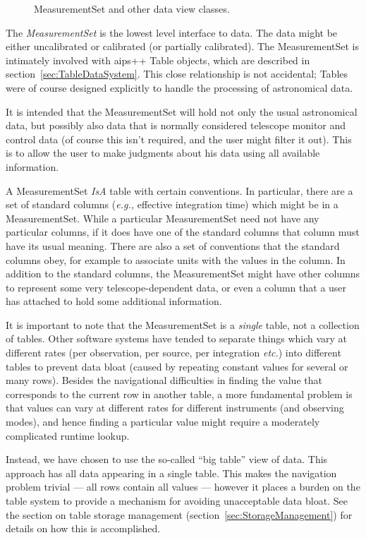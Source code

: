 \begin{figure}
\epsfverbosetrue
\epsfxsize=6.0in
\caption{MeasurementSet and other data view classes.}
\label{fig:ms}
\end{figure}

The {\em MeasurementSet} is the lowest level interface to data. The
data might be either uncalibrated or calibrated (or partially
calibrated). The MeasurementSet is intimately involved with {\sc
aips++} Table objects, which are described in
section~\ref{sec:TableDataSystem}. This close relationship is not
accidental; Tables were of course designed explicitly to handle the
processing of astronomical data.

It is intended that the MeasurementSet will hold not only the usual
astronomical data, but possibly also data that is normally considered
telescope monitor and control data (of course this isn't required, and
the user might filter it out). This is to allow the user to make
judgments about his data using all available information.

A MeasurementSet {\em IsA} table with certain conventions. In
particular, there are a set of standard columns ({\em e.g.,} effective
integration time) which might be in a MeasurementSet. While a
particular MeasurementSet need not have any particular columns, if it
does have one of the standard columns that column must have its usual
meaning. There are also a set of conventions that the standard columns
obey, for example to associate units with the values in the column. In
addition to the standard columns, the MeasurementSet might have other
columns to represent some very telescope-dependent data, or even a
column that a user has attached to hold some additional information.

It is important to note that the MeasurementSet is a {\em single}
table, not a collection of tables. Other software systems have tended
to separate things which vary at different rates (per observation, per
source, per integration {\em etc.}) into different tables to prevent data
bloat (caused by repeating constant values for several or many
rows). Besides the navigational difficulties in finding the value that
corresponds to the current row in another table, a more fundamental
problem is that values can vary at different rates for different
instruments (and observing modes), and hence finding a particular
value might require a moderately complicated runtime lookup.

Instead, we have chosen to use the so-called ``big table'' view of
data. This approach has all data appearing in a single table. This
makes the navigation problem trivial --- all rows contain all values
--- however it places a burden on the table system to provide a
mechanism for avoiding unacceptable data bloat. See the section on
table storage management (section~\ref{sec:StorageManagement}) for
details on how this is accomplished.

